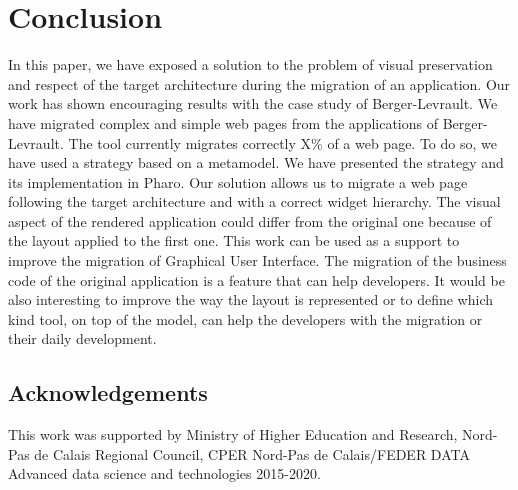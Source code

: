 \documentclass[conference]{IEEEtran}
\begin{document}

\section{Conclusion}
\label{sec:conclusion}


In this paper, we have exposed a solution to the problem of visual preservation
    and respect of the target architecture during the migration of an application.
Our work has shown encouraging results with the case study of Berger-Levrault.
We have migrated complex and simple web pages from the applications of Berger-Levrault.
The tool currently migrates correctly X\% of a web page. %
To do so, we have used a strategy based on a metamodel.
We have presented the strategy and its implementation in Pharo.
Our solution allows us to migrate a web page following the target architecture and
    with a correct widget hierarchy.
The visual aspect of the rendered application could differ from the original one because of
    the layout applied to the first one.
This work can be used as a support to improve the migration of Graphical User Interface. 
The migration of the business code of the original application is
    a feature that can help developers.
It would be also interesting to improve the way the layout is represented or
    to define which kind tool, on top of the model, can help the developers 
    with the migration or their daily development.
 

\subsection*{Acknowledgements} 
This work was supported by Ministry of Higher Education and Research, Nord-Pas de Calais Regional Council, CPER Nord-Pas de Calais/FEDER DATA Advanced data science and technologies 2015-2020.



\end{document}
